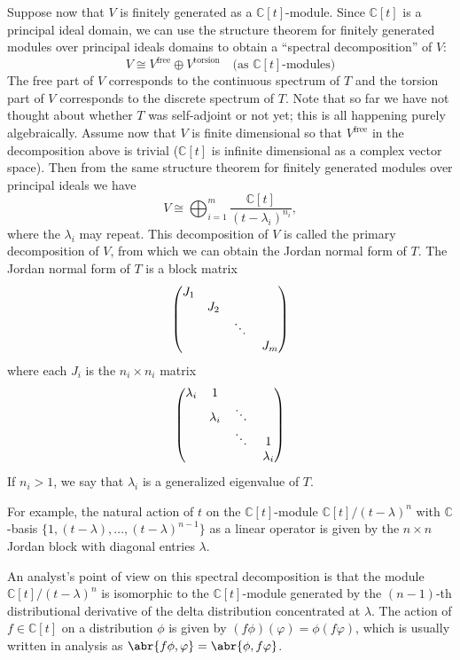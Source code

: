 \documentclass[11pt,leqno]{article}
\theoremstyle{plain}
\theoremstyle{definition}
\numberwithin{equation}{section}
\numberwithin{lem}{section}
\begin{document}
Suppose now that $V$ is finitely generated as a $\mathbb C[t]$-module. Since $\mathbb C[t]$ is a principal ideal domain, we can use the structure theorem for finitely generated modules over principal ideals domains to obtain a ``spectral decomposition'' of $V$:
\[V\cong V^{\textrm{free}}\oplus V^{\textrm{torsion}} \quad \text{(as $\mathbb C[t]$-modules)}\]
The free part of $V$ corresponds to the continuous spectrum of $T$ and the torsion part of $V$ corresponds to the discrete spectrum of $T$. Note that so far we have not thought about whether $T$ was self-adjoint or not yet; this is all happening purely algebraically. Assume now that $V$ is finite dimensional so that $V^{\textrm{free}}$ in the decomposition above is trivial ($\mathbb C[t]$ is infinite dimensional as a complex vector space). Then from the same structure theorem for finitely generated modules over principal ideals we have
\[V \cong \bigoplus_{i=1}^m \frac{\mathbb C[t]}{(t-\lambda_i)^{n_i}},\]
where the $\lambda_i$ may repeat. This decomposition of $V$ is called the primary decomposition of $V$, from which we can obtain the Jordan normal form of $T$. The Jordan normal form of $T$ is a block matrix
\[\begin{pmatrix}
	J_1 & & &  \\
	& J_2 & &  \\
	& & \mathbin{\rotatebox[origin=c]{-10}{$\ddots$}} &  \\
	& & & J_m
\end{pmatrix}\]
where each $J_i$ is the $n_i\times n_i$ matrix
\[\begin{pmatrix}
	\lambda_i & 1 \\
	& \lambda_i & \mathbin{\rotatebox[origin=c]{-10}{$\ddots$}}\\
	& & \mathbin{\rotatebox[origin=c]{-10}{$\ddots$}} & 1 \\
	& & & \lambda_i
\end{pmatrix}\]
If $n_i>1$, we say that $\lambda_i$ is a generalized eigenvalue of $T$.

For example, the natural action of $t$ on the $\mathbb C[t]$-module $\mathbb C[t]/(t-\lambda)^n$ with $\mathbb C$-basis $\{1, (t-\lambda),\dots, (t-\lambda)^{n-1}\}$ as a linear operator is given by the $n\times n$ Jordan block with diagonal entries $\lambda$.

An analyst's point of view on this spectral decomposition is that the module $\mathbb C[t]/(t-\lambda)^n$ is isomorphic to the $\mathbb C[t]$-module generated by the $(n-1)$-th distributional derivative of the delta distribution concentrated at $\lambda$. The action of $f\in \mathbb C[t]$ on a distribution $\phi$ is given by $(f\phi)(\varphi) = \phi(f\varphi)$, which is usually written in analysis as $\abr{f\phi,\varphi} = \abr{\phi,f\varphi}$.
\end{document}
